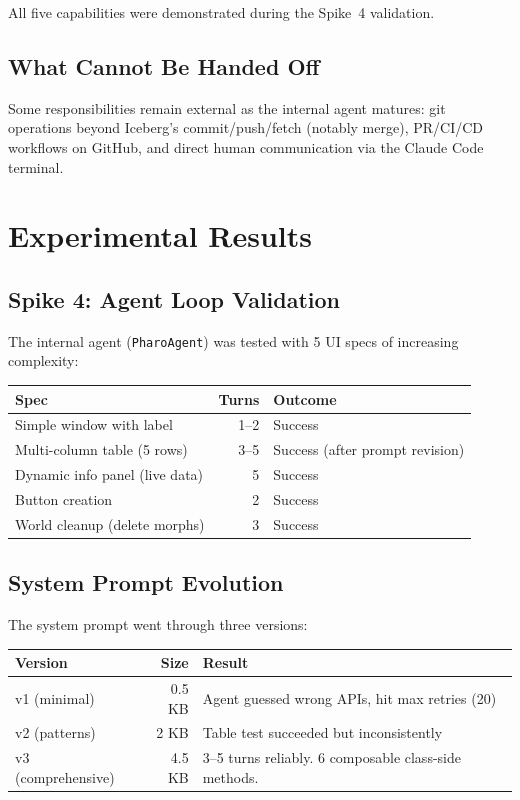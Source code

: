 \documentclass[a4paper,10pt,fleqn]{article}
\newcommand{\cls}[1]{\texttt{#1}}
\begin{document}
All five capabilities were demonstrated during the Spike~4 validation.

\subsection{What Cannot Be Handed Off}

Some responsibilities remain external as the internal agent matures:
git operations beyond Iceberg's commit/push/fetch (notably merge),
PR/CI/CD workflows on GitHub, and direct human communication via the
Claude Code terminal.

\section{Experimental Results}

\subsection{Spike 4: Agent Loop Validation}

The internal agent (\cls{PharoAgent}) was tested with 5 UI specs of
increasing complexity:

\begin{center}
\begin{tabular}{@{}lrl@{}}
\toprule
\textbf{Spec} & \textbf{Turns} & \textbf{Outcome} \\
\midrule
Simple window with label       & 1--2 & Success \\
Multi-column table (5 rows)    & 3--5 & Success (after prompt revision) \\
Dynamic info panel (live data) & 5    & Success \\
Button creation                & 2    & Success \\
World cleanup (delete morphs)  & 3    & Success \\
\bottomrule
\end{tabular}
\end{center}

\subsection{System Prompt Evolution}

The system prompt went through three versions:

\begin{center}
\begin{tabularx}{\linewidth}{@{}lrY@{}}
\toprule
\textbf{Version} & \textbf{Size} & \textbf{Result} \\
\midrule
v1 (minimal) & 0.5 KB & Agent guessed wrong APIs, hit max retries (20) \\
v2 (patterns) & 2 KB & Table test succeeded but inconsistently \\
v3 (comprehensive) & 4.5 KB & 3--5 turns reliably.  6 composable
  class-side methods. \\
\bottomrule
\end{tabularx}
\end{center}
\end{document}
